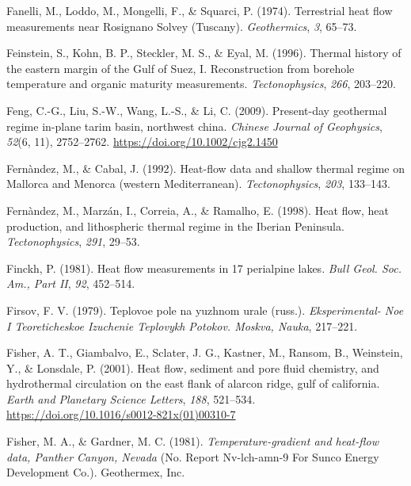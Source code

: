 \documentclass[draft,linenumbers]{agujournal2018}
\begin{document}
\leavevmode{}%
Fanelli, M., Loddo, M., Mongelli, F., \& Squarci, P. (1974). Terrestrial
heat flow measurements near {Rosignano Solvey (Tuscany)}.
\emph{Geothermics}, \emph{3}, 65--73.

\leavevmode{}%
Feinstein, S., Kohn, B. P., Steckler, M. S., \& Eyal, M. (1996). Thermal
history of the eastern margin of the {Gulf of Suez, I}. Reconstruction
from borehole temperature and organic maturity measurements.
\emph{Tectonophysics}, \emph{266}, 203--220.

\leavevmode{}%
Feng, C.-G., Liu, S.-W., Wang, L.-S., \& Li, C. (2009). Present-day
geothermal regime in-plane tarim basin, northwest china. \emph{Chinese
Journal of Geophysics}, \emph{52}(6, 11), 2752--2762.
\url{https://doi.org/10.1002/cjg2.1450}

\leavevmode{}%
Fernàndez, M., \& Cabal, J. (1992). Heat-flow data and shallow thermal
regime on {Mallorca and Menorca} (western {Mediterranean}).
\emph{Tectonophysics}, \emph{203}, 133--143.

\leavevmode{}%
Fernàndez, M., Marzán, I., Correia, A., \& Ramalho, E. (1998). Heat
flow, heat production, and lithospheric thermal regime in the {Iberian
Peninsula}. \emph{Tectonophysics}, \emph{291}, 29--53.

\leavevmode{}%
Finckh, P. (1981). Heat flow measurements in 17 perialpine lakes.
\emph{Bull Geol. Soc. Am., Part II}, \emph{92}, 452--514.

\leavevmode{}%
Firsov, F. V. (1979). Teplovoe pole na yuzhnom urale (russ.).
\emph{Eksperimental- Noe I Teoreticheskoe Izuchenie Teplovykh Potokov.
Moskva, Nauka}, 217--221.

\leavevmode{}%
Fisher, A. T., Giambalvo, E., Sclater, J. G., Kastner, M., Ransom, B.,
Weinstein, Y., \& Lonsdale, P. (2001). Heat flow, sediment and pore
fluid chemistry, and hydrothermal circulation on the east flank of
alarcon ridge, gulf of california. \emph{Earth and Planetary Science
Letters}, \emph{188}, 521--534.
\url{https://doi.org/10.1016/s0012-821x(01)00310-7}

\leavevmode{}%
Fisher, M. A., \& Gardner, M. C. (1981). \emph{Temperature-gradient and
heat-flow data, {Panther Canyon, Nevada}} (No. Report Nv-lch-amn-9 For
Sunco Energy Development Co.). Geothermex, Inc.
\end{document}
